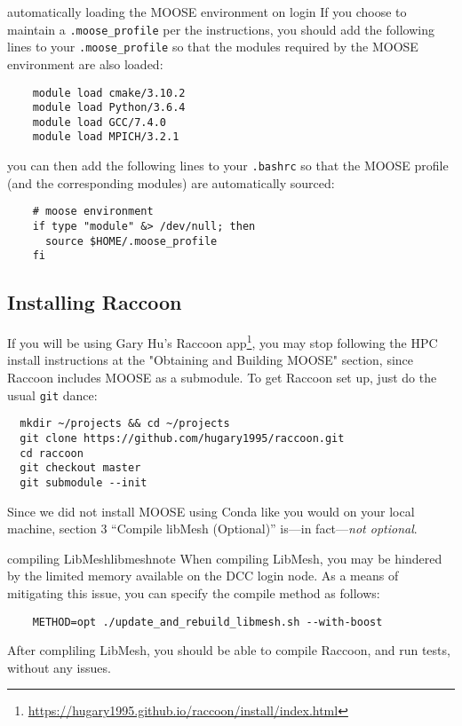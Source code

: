 \documentclass[class=Report, crop=false]{standalone}
\begin{document}
\begin{note}{automatically loading the MOOSE environment on login}
  If you choose to maintain a \texttt{.moose_profile} per the instructions, you should add the following lines to your \texttt{.moose_profile} so that the modules required by the MOOSE environment are also loaded:

  \begin{verbatim}
    module load cmake/3.10.2
    module load Python/3.6.4
    module load GCC/7.4.0
    module load MPICH/3.2.1
  \end{verbatim}

  you can then add the following lines to your \texttt{.bashrc} so that the MOOSE profile (and the corresponding modules) are automatically sourced:

  \begin{verbatim}
    # moose environment
    if type "module" &> /dev/null; then
      source $HOME/.moose_profile
    fi
  \end{verbatim}
\end{note}

\subsection{Installing Raccoon}
If you will be using Gary Hu's Raccoon app\footnote{\url{https://hugary1995.github.io/raccoon/install/index.html}}, you may stop following the HPC install instructions at the "Obtaining and Building MOOSE" section, since Raccoon includes MOOSE as a submodule. To get Raccoon set up, just do the usual \texttt{git} dance:

\begin{verbatim}
  mkdir ~/projects && cd ~/projects
  git clone https://github.com/hugary1995/raccoon.git
  cd raccoon
  git checkout master
  git submodule --init
\end{verbatim}

\noindent Since we did not install MOOSE using Conda like you would on your local machine, section 3 ``Compile libMesh (Optional)'' is---in fact---\textit{not optional}.

\begin{note}{compiling LibMesh}{libmeshnote}
  When compiling LibMesh, you may be hindered by the limited memory available on the DCC login node. As a means of mitigating this issue, you can specify the compile method as follows:
  \begin{verbatim}
    METHOD=opt ./update_and_rebuild_libmesh.sh --with-boost
  \end{verbatim}
\end{note}

\noindent After compliling LibMesh, you should be able to compile Raccoon, and run tests, without any issues.
\end{document}
